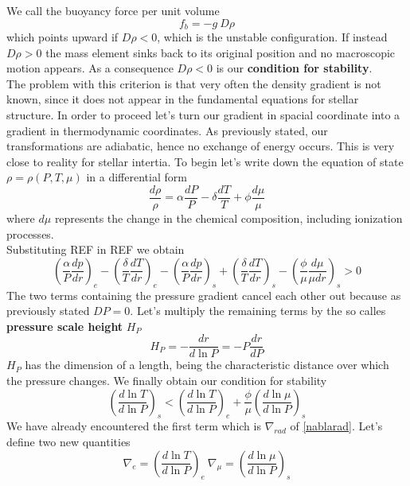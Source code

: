 \documentclass[11pt]{article}
\numberwithin{equation}{section}
\begin{document}
We call the buoyancy force per unit volume 
$$
f_b=- g \ D \rho
$$
which points upward if $D \rho < 0$, which is the unstable configuration. If instead $D \rho > 0$ the mass element sinks back to its original position and no macroscopic motion appears. As a consequence $D \rho<0$ is our \textbf{condition for stability}.\\
The problem with this criterion is that very often the density gradient is not known, since it does not appear in the fundamental equations for stellar structure. In order to proceed let's turn our gradient in spacial coordinate into a gradient in thermodynamic coordinates. As previously stated, our transformations are adiabatic, hence no exchange of energy occurs. This is very close to reality for stellar intertia. To begin let's write down the equation of state $\rho = \rho (P, T, \mu)$ in a differential form
\begin{equation}\label{EoSdiff}
	\frac{d \rho}{\rho} = \alpha \frac{d P}{P} - \delta \frac{d T}{T} + \phi \frac{d \mu}{\mu}
\end{equation}
where $d \mu$ represents the change in the chemical composition, including ionization processes. \\
Substituting REF in REF we obtain
\begin{equation}
	\left (\frac{\alpha}{P} \frac{dp}{dr}\right )_e - \left ( \frac{\delta}{T}\frac{dT}{dr}\right )_e -  \left (\frac{\alpha}{P} \frac{dp}{dr}\right )_s +  \left ( \frac{\delta}{T}\frac{dT}{dr}\right )_s -  \left ( \frac{\phi}{\mu}\frac{d \mu}{\mu dr}\right )_s>0 
\end{equation}
The two terms containing the pressure gradient cancel each other out because as previously stated $DP=0$. Let's multiply the remaining terms by the so calles \textbf{pressure scale height} $H_P$
\begin{equation}\label{scaleheight}
	H_P=-\frac{dr}{d \ln P}= - P \frac{dr}{dP}
\end{equation}
$H_P$ has the dimension of a length, being the characteristic distance over which the pressure changes.
We finally obtain our condition for stability
\begin{equation}\label{criterionstab}
	\left (   \frac{d \ln T}{d \ln P}    \right )_s <  \left (   \frac{d \ln T}{d \ln P}   \right )_e +  \frac{\phi}{\mu} \left (   \frac{d \ln \mu}{d \ln P}    \right )_s
\end{equation}
We have already encountered the first term which is $\nabla_{rad}$ of \ref{nablarad}.
Let's define two new quantities
\begin{equation}\label{nablas}
	\nabla_{e} = \left (  \frac{d \ln T}{d \ln P}   \right )_e \  \nabla_{\mu} = \left (  \frac{d \ln \mu}{d \ln P}   \right )_s
\end{equation}
\end{document}
